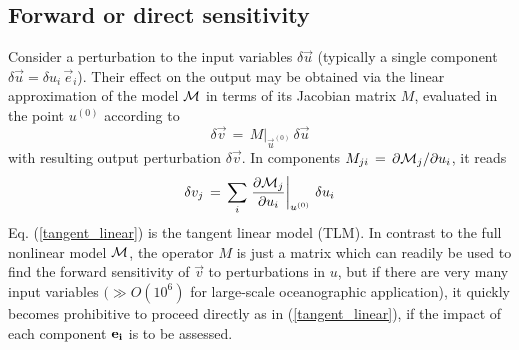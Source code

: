 \subsection{Forward or direct sensitivity}
%
Consider a perturbation to the input variables $\delta \vec{u}$
(typically a single component 
$\delta \vec{u} = \delta u_{i} \, {\vec{e}_{i}}$).
Their effect on the output may be obtained via the linear
approximation of the model $ {\cal M}$ in terms of its Jacobian matrix
$ M $, evaluated in the point $u^{(0)}$ according to
%
\begin{equation}
\delta \vec{v} \, = \, M |_{\vec{u}^{(0)}} \, \delta \vec{u}
\label{tangent_linear}
\end{equation}
with resulting output perturbation $\delta \vec{v}$.
In components
$M_{j i} \, = \, \partial {\cal M}_{j} / \partial u_{i} $, 
it reads
%
\begin{equation}
\delta v_{j} \, = \, \sum_{i} 
\left. \frac{\partial {\cal M}_{j}}{\partial u_{i}} \right|_{u^{(0)}} \, 
\delta u_{i}
\label{jacobi_matrix}
\end{equation}
%
Eq. (\ref{tangent_linear}) is the {\sf tangent linear model (TLM)}.
In contrast to the full nonlinear model $ {\cal M} $, the operator
$ M $ is just a matrix
which can readily be used to find the forward sensitivity of $\vec{v}$ to 
perturbations in  $u$,
but if there are very many input variables $(\gg O(10^{6})$ for 
large-scale oceanographic application), it quickly becomes 
prohibitive to proceed directly as in (\ref{tangent_linear}),
if the impact of each component $ {\bf e_{i}} $ is to be assessed. 

